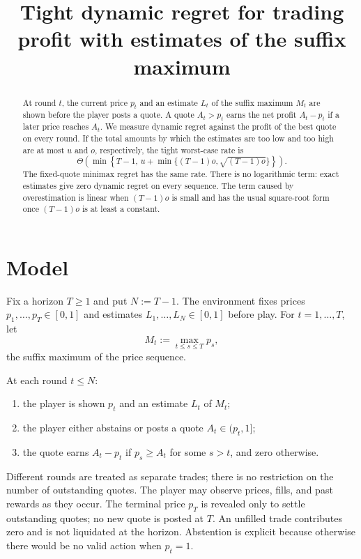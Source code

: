 \documentclass[11pt]{article}
\title{Tight dynamic regret for trading profit with estimates of the suffix maximum}
\author{}
\date{}
\theoremstyle{remark}
\begin{document}
\maketitle

\begin{abstract}
At round $t$, the current price $p_t$ and an estimate $L_t$ of the suffix
maximum $M_t$ are shown before the player posts a quote.  A quote $A_t>p_t$
earns the net profit $A_t-p_t$ if a later price reaches $A_t$.  We measure
dynamic regret against the profit of the best quote on every round.  If the
total amounts by which the estimates are too low and too high are at most
$u$ and $o$, respectively, the tight worst-case rate is
\[
  \Theta\!\left(
    \min\left\{T-1,\,
      u+\min\bigl\{(T-1)o,\sqrt{(T-1)o}\bigr\}
    \right\}
  \right).
\]
The fixed-quote minimax regret has the same rate.  There is no logarithmic
term: exact estimates give zero dynamic regret on every sequence.  The term
caused by overestimation is linear when $(T-1)o$ is small and has the usual
square-root form once $(T-1)o$ is at least a constant.
\end{abstract}

\section{Model}

Fix a horizon $T\ge 1$ and put $N:=T-1$.  The environment fixes prices
$p_1,\ldots,p_T\in[0,1]$ and estimates $L_1,\ldots,L_N\in[0,1]$ before play.
For $t=1,\ldots,T$, let
\[
  M_t:=\max_{t\le s\le T}p_s,
\]
the suffix maximum of the price sequence.

At each round $t\le N$:
\begin{enumerate}
  \item the player is shown $p_t$ and an estimate $L_t$ of $M_t$;
  \item the player either abstains or posts a quote $A_t\in(p_t,1]$;
  \item the quote earns $A_t-p_t$ if $p_s\ge A_t$ for some $s>t$, and zero
        otherwise.
\end{enumerate}
Different rounds are treated as separate trades; there is no restriction on
the number of outstanding quotes.  The player may observe prices, fills, and
past rewards as they occur.  The terminal price $p_T$ is revealed only to
settle outstanding quotes; no new quote is posted at $T$.  An unfilled trade
contributes zero and is not liquidated at the horizon.  Abstention is explicit
because otherwise there would be no valid action when $p_t=1$.
\end{document}

